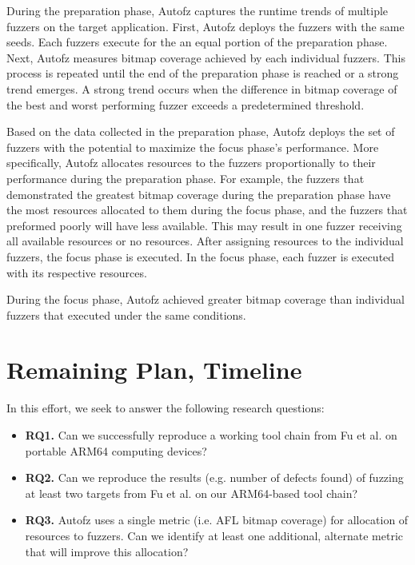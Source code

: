 During the preparation phase, Autofz captures the runtime trends of multiple fuzzers on the target application. First, Autofz deploys the fuzzers with the same seeds. Each fuzzers execute for the an equal portion of the preparation phase. Next, Autofz measures bitmap coverage achieved by each individual fuzzers. This process is repeated until the end of the preparation phase is reached or a strong trend emerges. A strong trend occurs when the difference in bitmap coverage of the best and worst performing fuzzer exceeds a predetermined threshold.

Based on the data collected in the preparation phase, Autofz deploys the set of fuzzers with the potential to maximize the focus phase’s performance. More specifically, Autofz allocates resources to the fuzzers proportionally to their performance during the preparation phase. For example, the fuzzers that demonstrated the greatest bitmap coverage during the preparation phase have the most resources allocated to them during the focus phase, and the fuzzers that preformed poorly will have less available. This may result in one fuzzer receiving all available resources or no resources. After assigning resources to the individual fuzzers, the focus phase is executed. In the focus phase, each fuzzer is executed with its respective resources.

During the focus phase, Autofz achieved greater bitmap coverage than individual fuzzers that executed under the same conditions.
\cite{Fu}

\section{Remaining Plan, Timeline}
In this effort, we seek to answer the following research questions:

\begin{itemize}
    \item \textbf{RQ1.} Can we successfully reproduce a working tool chain from
    Fu et al. \cite{Fu} on portable ARM64 computing devices?
    \item \textbf{RQ2.} Can we reproduce the results (e.g. number of defects found)
     of fuzzing at least two targets from Fu et al. \cite{Fu} on our ARM64-based
      tool chain?
    \item \textbf{RQ3.} Autofz uses a single metric (i.e. AFL bitmap coverage) for
     allocation of resources to fuzzers. Can we identify at least one additional,
     alternate metric that will improve this allocation?
\end{itemize}

